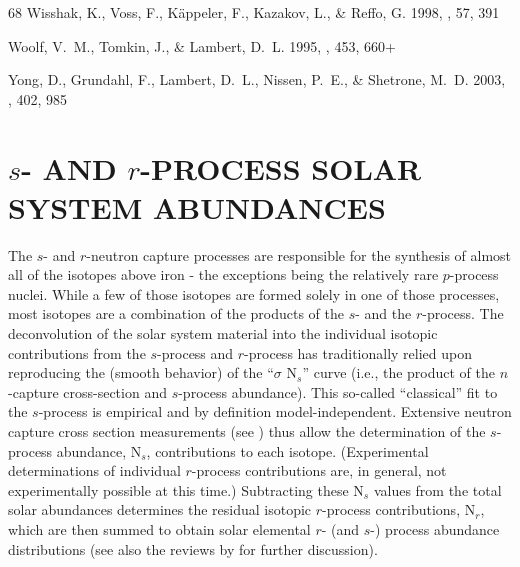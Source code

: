 \documentclass[12pt,preprint]{aastex}
\begin{document}
{\begin{thebibliography}{68}
{Wisshak}, K., {Voss}, F., {K{\" a}ppeler}, F., {Kazakov}, L., \& {Reffo}, G.
  1998, \prc, 57, 391

{Woolf}, V.~M., {Tomkin}, J., \& {Lambert}, D.~L. 1995, \apj, 453, 660+

{Yong}, D., {Grundahl}, F., {Lambert}, D.~L., {Nissen}, P.~E., \& {Shetrone},
  M.~D. 2003, \aap, 402, 985

\end{thebibliography}
\appendix

\section{$s$- AND $r$-PROCESS SOLAR  SYSTEM ABUNDANCES}

The $s$- and $r$-neutron capture processes are responsible for the synthesis of almost all of the isotopes above iron - the exceptions being the relatively rare  $p$-process nuclei. While a few  of those isotopes are formed solely in one of those processes, most isotopes are a combination of the products of the $s$- and the $r$-process.   The deconvolution of the solar system material into the individual isotopic contributions from the $s$-process and $r$-process has traditionally relied upon reproducing the (smooth behavior) of the  ``$\sigma$ N$_s$'' curve (i.e., the product of the $n$-capture cross-section and $s$-process abundance).  This so-called ``classical'' fit  to the $s$-process is empirical and by definition  model-independent.  Extensive neutron capture cross section measurements (see \citealt{Kappeler1989})
thus allow the determination of the  $s$-process abundance, N$_s$, contributions to each isotope.   (Experimental determinations of individual $r$-process contributions are, in general, not experimentally possible at this time.)  Subtracting these N$_s$ values from the total solar abundances  determines  the residual isotopic $r$-process contributions, N$_r$, which are then summed to obtain solar elemental $r$- (and $s$-) process abundance distributions (see also the reviews by \citealt{Cowan1991, Truran2002, Sneden2003} for further discussion). 

}
\end{document}
